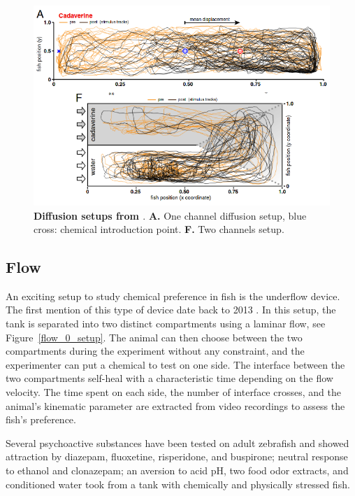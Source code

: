     \begin{figure}[h]
      \centering
      \includegraphics[width=1\textwidth]{part_2/assets/diffusion.png}
      \caption{\textbf{Diffusion setups from \cite{hussain2013high}}. \textbf{A.} One channel diffusion setup, blue cross: chemical introduction point. \textbf{F.} Two channels setup.}
      \label{diffusion_setup}
    \end{figure}

    \subsection{Flow}
    An exciting setup to study chemical preference in fish is the underflow device. The first mention of this type of device date back to 2013 \cite{readman2013fish}. In this setup, the tank is separated into two distinct compartments using a laminar flow, see Figure~\ref{flow_0_setup}. The animal can then choose between the two compartments during the experiment without any constraint, and the experimenter can put a chemical to test on one side. The interface between the two compartments self-heal with a characteristic time depending on the flow velocity. The time spent on each side, the number of interface crosses, and the animal's kinematic parameter are extracted from video recordings to assess the fish's preference.

    Several psychoactive substances have been tested on adult zebrafish \cite{abreu2016acute, abreu2016behavioral} and showed attraction by diazepam, fluoxetine, risperidone, and buspirone; neutral response to ethanol and clonazepam; an aversion to acid pH, two food odor extracts, and conditioned water took from a tank with chemically and physically stressed fish.

